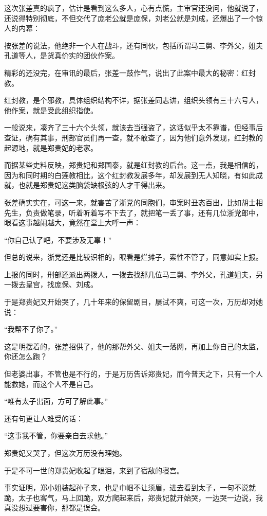 \begin{multicols}{\theparacolNo}
这次张差真的疯了，估计是看到这么多人，心有点慌，主审官还没问，他就说了，还说得特别彻底，不但交代了庞老公就是庞保，刘老公就是刘成，还爆出了一个惊人的内幕：

按张差的说法，他绝非一个人在战斗，还有同伙，包括所谓马三舅、李外父，姐夫孔道等人，是货真价实的团伙作案。

精彩的还没完，在审讯的最后，张差一鼓作气，说出了此案中最大的秘密：红封教。

红封教，是个邪教，具体组织结构不详，据张差同志讲，组织头领有三十六号人，他作案，就是受此组织指使。

一般说来，凑齐了三十六个头领，就该去当强盗了，这话似乎太不靠谱，但经事后查证，确有其事，刑部官员们再一查，就不敢查了，因为他们意外发现，红封教的起源地，就是郑贵妃的老家。

而据某些史料反映，郑贵妃和郑国泰，就是红封教的后台。这一点，我是相信的，因为和同时期的白莲教相比，这个红封教发展多年，却发展到无人知晓，有如此成就，也就是郑贵妃这类脑袋缺根弦的人才干得出来。

张差确实实在，可这一来，就害苦了浙党的同胞们，审案时丑态百出，比如胡士相先生，负责做笔录，听着听着写不下去了，就把笔一丢了事，还有几位浙党郎中，眼看这事越闹越大，竟然在堂上大呼一声：

“你自己认了吧，不要涉及无辜！”

但总的说来，浙党还是比较识相的，眼看是烂摊子，索性不管了，同意如实上报。

上报的同时，刑部还派出两拨人，一拨去找那几位马三舅、李外父，孔道姐夫，另一拨去皇宫，找庞保、刘成。

于是郑贵妃又开始哭了，几十年来的保留剧目，屡试不爽，可这一次，万历却对她说：

“我帮不了你了。”

这是明摆着的，张差招供了，他的那帮外父、姐夫一落网，再加上你自己的太监，你还怎么跑？

但老婆出事，不管也是不行的，于是万历告诉郑贵妃，而今普天之下，只有一个人能救她，而这个人不是自己。

“唯有太子出面，方可了解此事。”

还有句更让人难受的话：

“这事我不管，你要亲自去求他。”

郑贵妃又哭了，但这次万历没有理她。

于是不可一世的郑贵妃收起了眼泪，来到了宿敌的寝宫。

事实证明，郑小姐装起孙子来，也是巾帼不让须眉，进去看到太子，一句不说就跪，太子也客气，马上回跪，双方爬起来后，郑贵妃就开始哭，一边哭一边说，我真没想过要害你，那都是误会。


\end{multicols}
